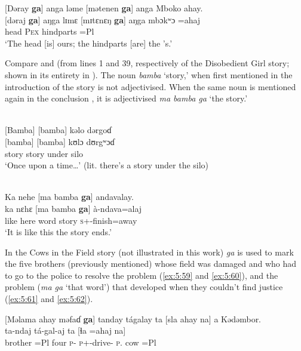 \ea \label{ex:5:56}
{}[Dəray  \textbf{ga}]  anga  ləme  [mətenen  \textbf{ga}]  anga  Mboko  ahay.\\
\gll  {}[dəraj  \textbf{ga}]  aŋga  lɪmɛ    [mɪtɛnɛŋ     \textbf{ga}]    aŋga  mbɔkʷɔ   =ahaj\\
      head  {\ADJ}  {\POSS}  \textsc{Pex}    hindparts  {\ADJ}    {\POSS}    =Pl\\
\glt  ‘The head [is] ours; the hindparts [are] the 's.’ 
\z

Compare  and  (from lines 1 and 39, respectively of the Disobedient Girl story; shown in its entirety in ). The noun \textit{bamba} ‘story,’ when first mentioned in the introduction of the story  is not adjectivised. When the same noun is mentioned again in the conclusion , it is adjectivised \textit{ma bamba ga} ‘the story.’ 

\ea \label{ex:5:57}\\
{}[Bamba]  [bamba]  kəlo  dərgoɗ\\
\gll  {}[bamba]   [bamba]  kʊlɔ    dʊrgʷɔɗ\\
      story        story        under    silo\\
\glt  ‘Once upon a time…’ (lit. there’s a story under the silo)
\z

\ea \label{ex:5:58}\\
Ka  nehe  [ma  bamba \textbf{ga}]  andavalay.\\
\gll  ka  nɛhɛ  [ma    bamba \textbf{ga}]  à-ndava=alaj\\
      like  here  word   story     {\ADJ}     \textsc{s}+{\PFV}-finish=away\\
\glt  ‘It is like this the story ends.’  
\z

In the Cows in the Field story (not illustrated in this work) \textit{ga} is used to mark the five brothers (previously mentioned) whose field was damaged and who had to go to the police to resolve the problem (\ref{ex:5:59} and \ref{ex:5:60}), and the problem (\textit{ma ga} ‘that word’) that developed when they couldn’t find justice (\ref{ex:5:61} and \ref{ex:5:62}). 

\ea \label{ex:5:59}
{}[Məlama  ahay  məfaɗ  \textbf{ga}]  tanday  tágalay  ta  [sla  ahay  na]  a  Kədəmbor.\\
\gll  [məlama =ahaj   məfaɗ  \textbf{ga}]    ta-ndaj   tá-gal-aj          ta  [ɬa =ahaj   na]\\   
      brother     =Pl      four    {\ADJ}  \textsc{p}-{\PRG}  \textsc{p}+{\IFV}-drive-{\CL} \textsc{p}.{\DO}    cow =Pl       {\PSP}\\   
      
